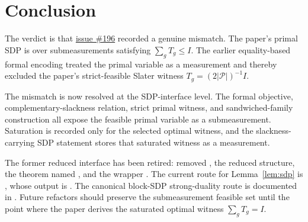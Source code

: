 \documentclass[11pt]{article}
\newcommand{\cP}{\mathcal P}
\begin{document}
\section{Conclusion}

The verdict is that
\href{https://github.com/LionSR/MIPStarRE/issues/196}{issue \#196} recorded a
genuine mismatch. The paper's primal SDP is over submeasurements satisfying
$\sum_g T_g\le I$. The earlier equality-based formal encoding treated the
primal variable as a measurement and thereby excluded the paper's strict-feasible
Slater witness $T_g=(2|\cP|)^{-1}I$.

The mismatch is now resolved at the SDP-interface level. The formal objective,
complementary-slackness relation, strict primal witness, and sandwiched-family
construction all expose the feasible primal variable as a submeasurement.
Saturation is recorded only for the selected optimal witness, and the
slackness-carrying SDP statement stores that saturated witness as a measurement.

The former reduced interface has been retired:  removed
, the reduced  structure, the theorem
named , and the wrapper . The
current \Lean{} route for Lemma~\ref{lem:sdp} is
, whose output is
.  The canonical block-SDP strong-duality route
is documented in
. Future
refactors should preserve the submeasurement feasible set until the point where
the paper derives the saturated optimal witness $\sum_g T_g=I$.



\end{document}

